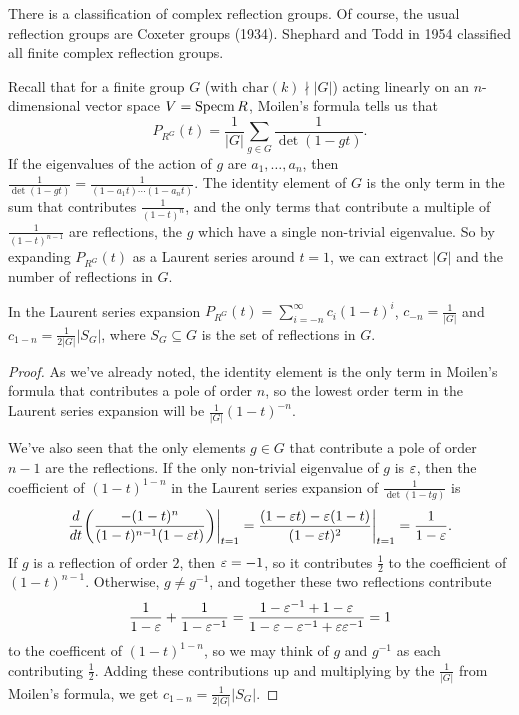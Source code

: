 
There is a classification of complex reflection groups. Of course, the usual reflection groups are Coxeter groups (1934). Shephard and Todd in 1954 classified all finite complex reflection groups. 

Recall that for a finite group $G$ (with $\mathrm{char}(k)\nmid |G|$) acting linearly on an $n$-dimensional vector space $V=\operatorname{Specm} R$, Moilen's formula tells us that
\[
 P_{R^G}(t)=\frac{1}{|G|}\sum_{g\in G} \frac{1}{\det(1-gt)}.
\]
If the eigenvalues of the action of $g$ are $a_1,\dots, a_n$, then $\frac{1}{\det(1-gt)}=\frac{1}{(1-a_1t)\cdots (1-a_nt)}$. The identity element of $G$ is the only term in the sum that contributes $\frac{1}{(1-t)^n}$, and the only terms that contribute a multiple of $\frac{1}{(1-t)^{n-1}}$ are reflections, the $g$ which have a single non-trivial eigenvalue. So by expanding $P_{R^G}(t)$ as a Laurent series around $t=1$, we can extract $|G|$ and the number of reflections in $G$.
\begin{lemma}\label{lec6Lem:ord+refls}
 In the Laurent series expansion $P_{R^G}(t)= \sum_{i=-n}^\infty c_i(1-t)^i$, $c_{-n}=\frac{1}{|G|}$ and $c_{1-n}=\frac{1}{2|G|}|S_G|$, where $S_G\subseteq G$ is the set of reflections in $G$.
\end{lemma}
\begin{proof}
 As we've already noted, the identity element is the only term in Moilen's formula that contributes a pole of order $n$, so the lowest order term in the Laurent series expansion will be $\frac{1}{|G|}(1-t)^{-n}$.

 We've also seen that the only elements $g\in G$ that contribute a pole of order $n-1$ are the reflections. If the only non-trivial eigenvalue of $g$ is $\varepsilon$, then the coefficient of $(1-t)^{1-n}$ in the Laurent series expansion of $\frac{1}{\det(1-tg)}$ is
 \[
  \frac{d }{d t}\biggl(\frac{-(1-t)^n}{(1-t)^{n-1}(1-\varepsilon t)}\biggr)\biggr|_{t=1} = \frac{(1-\varepsilon t)-\varepsilon(1-t)}{(1-\varepsilon t)^2}\biggr|_{t=1} = \frac{1}{1-\varepsilon}.
 \]
 If $g$ is a reflection of order $2$, then $\varepsilon=-1$, so it contributes $\frac 12$ to the coefficient of $(1-t)^{n-1}$. Otherwise, $g\neq g^{-1}$, and together these two reflections contribute
 \[
  \frac{1}{1-\varepsilon} + \frac{1}{1-\varepsilon^{-1}} = \frac{1-\varepsilon^{-1}+1-\varepsilon}{1-\varepsilon-\varepsilon^{-1}+\varepsilon\varepsilon^{-1}} = 1
 \]
 to the coefficent of $(1-t)^{1-n}$, so we may think of $g$ and $g^{-1}$ as each contributing $\frac 12$. Adding these contributions up and multiplying by the $\frac{1}{|G|}$ from Moilen's formula, we get $c_{1-n}=\frac{1}{2|G|}|S_G|$.
\end{proof}
